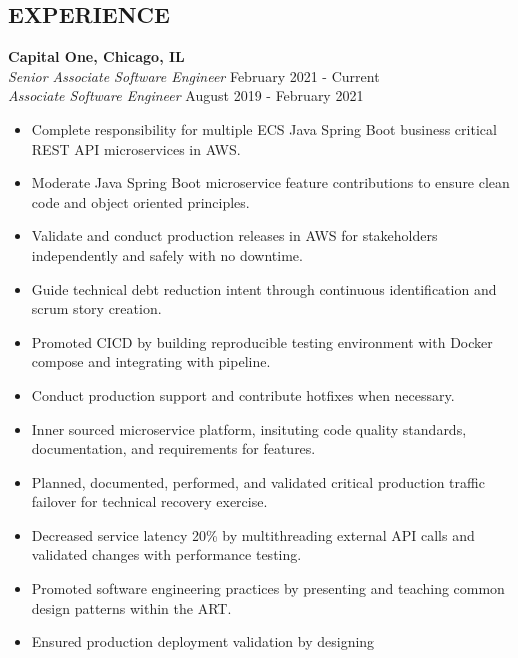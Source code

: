 \documentclass[overlapped]{res}
\begin{document}
\begin{resume}
\section{EXPERIENCE}
\textbf{Capital One, Chicago, IL}  \\
{\sl Senior Associate Software Engineer} \hfill February 2021 - Current \\
{\sl Associate Software Engineer} \hfill August 2019 - February 2021
\begin{itemize}  \itemsep -2pt %
    \item Complete responsibility for multiple ECS Java Spring Boot business critical REST API microservices in AWS.
    \item Moderate Java Spring Boot microservice feature contributions to ensure clean code and object oriented principles.  %
    \item Validate and conduct production releases in AWS for stakeholders independently and safely with no downtime.
    \item Guide technical debt reduction intent through continuous identification and scrum story creation.
    \item Promoted CICD by building reproducible testing environment with Docker compose and integrating with pipeline.
    \item Conduct production support and contribute hotfixes when necessary.
    \item Inner sourced microservice platform, insituting code quality standards, documentation, and requirements for features.
    \item Planned, documented, performed, and validated critical production traffic failover for technical recovery exercise. 
    \item Decreased service latency 20\% by multithreading external
    API calls and validated changes with performance testing.
    \item Promoted software engineering practices by presenting and teaching common design patterns within the ART. 
    \item Ensured production deployment validation by designing 

\end{itemize}
\end{resume}
\end{document}
